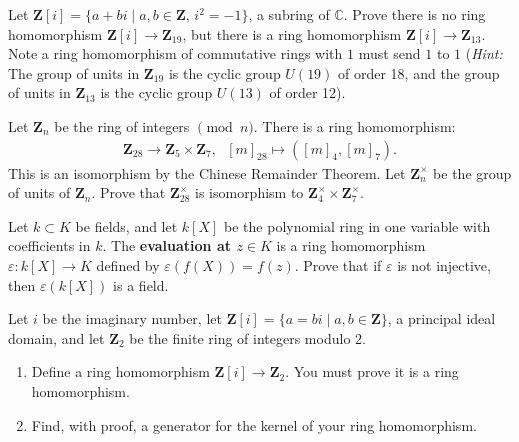 \documentclass[11pt,twoside,openany]{memoir}
\begin{document}
    \begin{exercise}
    Let $\mathbf{Z}[i]=\{a+bi \mid a,b\in \mathbf{Z},\, i^2=-1\}$, a subring of $\mathbb{C}$. Prove there is no ring homomorphism $\mathbf{Z}[i]\to \mathbf{Z}_{19}$, but there is a ring homomorphism $\mathbf{Z}[i]\to \mathbf{Z}_{13}$. Note a ring homomorphism of commutative rings with $1$ must send $1$ to $1$ (\textit{Hint:} The group of units in $\mathbf{Z}_{19}$ is the cyclic group $U(19)$ of order 18, and the group of units in $\mathbf{Z}_{13}$ is the cyclic group $U(13)$ of order 12).
    \end{exercise}
    
    \begin{exercise}
    Let $\mathbf{Z}_n$ be the ring of integers $\pmod{n}$. There is a ring homomorphism:
        \begin{equation*}
        \begin{split}
            \mathbf{Z}_{28} \rightarrow \mathbf{Z}_5 \times \mathbf{Z}_7, \hspace{7pt} [m]_{28} \mapsto ([m]_4 , [m]_7).
        \end{split}
        \end{equation*}
    This is an isomorphism by the Chinese Remainder Theorem. Let $\mathbf{Z}_n^\times$ be the group of units of $\mathbf{Z}_n$. Prove that $\mathbf{Z}_{28}^\times$ is isomorphism to $\mathbf{Z}_4^\times \times \mathbf{Z}_7^\times$.
    \end{exercise}
    
    \begin{exercise}
    Let $k \subset K$ be fields, and let $k[X]$ be the polynomial ring in one variable with coefficients in $k$. The \textbf{evaluation at $z \in K$} is a ring homomorphism $\varepsilon:k[X]\to K$ defined by $\varepsilon(f(X))=f(z)$. Prove that if $\varepsilon$ is not injective, then $\varepsilon(k[X])$ is a field.
    \end{exercise}
    
    \begin{exercise}
    Let $i$ be the imaginary number, let $\mathbf{Z}[i] = \{a = bi \mid a,b \in \mathbf{Z}\}$, a principal ideal domain, and let $\mathbf{Z}_2$ be the finite ring of integers modulo 2.
    \begin{enumerate}[label = (\arabic*)]
        \item Define a ring homomorphism $\mathbf{Z}[i]\to \mathbf{Z}_2$. You must prove it is a ring homomorphism.
        \item Find, with proof, a generator for the kernel of your ring homomorphism.
    \end{enumerate}
    \end{exercise}
    
\end{document}
